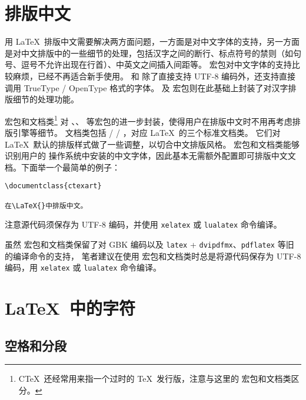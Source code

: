 \section{排版中文}\label{sec:chinese}

用 \LaTeX\ 排版中文需要解决两方面问题，一方面是对中文字体的支持，另一方面是对中文排版中的一些细节的处理，包括汉字之间的断行、标点符号的禁则（如句号、逗号不允许出现在行首）、中英文之间插入间距等。 宏包对中文字体的支持比较麻烦，已经不再适合新手使用。 和  除了直接支持 UTF-8 编码外，还支持直接调用 TrueType / OpenType 格式的字体。 及  宏包则在此基础上封装了对汉字排版细节的处理功能。

 宏包和文档类\footnote{C\TeX\ 还经常用来指一个过时的 \TeX\ 发行版，注意与这里的  宏包和文档类区分。}
对 、、 等宏包的进一步封装，使得用户在排版中文时不用再考虑排版引擎等细节。
 文档类包括  /  / ，对应 \LaTeX\ 的三个标准文档类。
它们对 \LaTeX\ 默认的排版样式做了一些调整，以切合中文排版风格。 宏包和文档类能够识别用户的
操作系统中安装的中文字体，因此基本无需额外配置即可排版中文文档。下面举一个最简单的例子：

\begin{verbatim}
\documentclass{ctexart}

在\LaTeX{}中排版中文。

\end{verbatim}

注意源代码须保存为 UTF-8 编码，并使用 \texttt{xelatex} 或 \texttt{lualatex} 命令编译。

虽然  宏包和文档类保留了对 GBK 编码以及 \texttt{latex} + \texttt{dvipdfmx}、\texttt{pdflatex} 等旧的编译命令的支持，
笔者建议在使用  宏包和文档类时总是将源代码保存为 UTF-8 编码，用 \texttt{xelatex} 或 \texttt{lualatex} 命令编译。

\section{\LaTeX\ 中的字符}\label{sec:text-symbols}

\subsection{空格和分段}\label{subsec:spaces}

